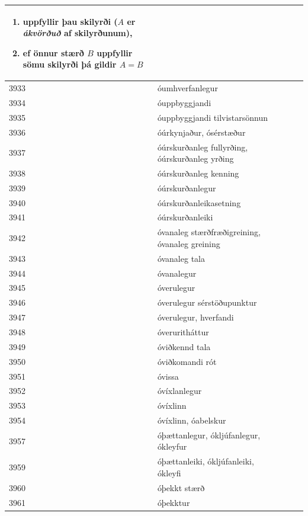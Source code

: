 \begin{longtable}{p{}|p{}|p{}|p{}|p{}}
\begin{enumerate}
    \item uppfyllir þau skilyrði ($A$ er \textit{ákvörðuð} af skilyrðunum),
    \item ef önnur stærð $B$ uppfyllir sömu skilyrði þá gildir $A=B$
\end{enumerate} &  &  \\
\hline
3933 & óumhverfanlegur &  &  &  \\
\hline
3934 & óuppbyggjandi &  &  &  \\
\hline
3935 & óuppbyggjandi tilvistarsönnun &  &  &  \\
\hline
3936 & óúrkynjaður, ósérstæður &  &  &  \\
\hline
3937 & óúrskurðanleg fullyrðing, óúrskurðanleg yrðing &  &  &  \\
\hline
3938 & óúrskurðanleg kenning &  &  &  \\
\hline
3939 & óúrskurðanlegur &  &  &  \\
\hline
3940 & óúrskurðanleikasetning &  &  &  \\
\hline
3941 & óúrskurðanleiki &  &  &  \\
\hline
3942 & óvanaleg stærðfræðigreining, óvanaleg greining &  &  &  \\
\hline
3943 & óvanaleg tala &  &  &  \\
\hline
3944 & óvanalegur &  &  &  \\
\hline
3945 & óverulegur &  &  &  \\
\hline
3946 & óverulegur sérstöðupunktur &  &  &  \\
\hline
3947 & óverulegur, hverfandi &  &  &  \\
\hline
3948 & óveruritháttur &  &  &  \\
\hline
3949 & óviðkennd tala &  &  &  \\
\hline
3950 & óviðkomandi rót &  &  &  \\
\hline
3951 & óvissa &  &  &  \\
\hline
3952 & óvíxlanlegur &  &  &  \\
\hline
3953 & óvíxlinn &  &  &  \\
\hline
3954 & óvíxlinn, óabelskur &  &  &  \\
\hline
3957 & óþættanlegur, ókljúfanlegur, ókleyfur &  &  &  \\
\hline
3959 & óþættanleiki, ókljúfanleiki, ókleyfi &  &  &  \\
\hline
3960 & óþekkt stærð &  &  &  \\
\hline
3961 & óþekktur &  &  &  \\

\end{longtable}
